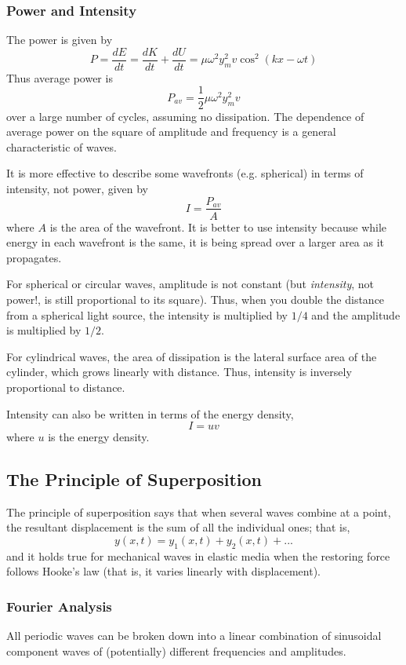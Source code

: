 \documentclass[../PhysicsFormulae.tex]{subfiles}
\begin{document}
\subsubsection{Power and Intensity}
The power is given by 
\[ P = \frac{dE}{dt} = \frac{dK}{dt} + \frac{dU}{dt} = \mu \omega^2 y_m^2 v \cos^2(kx - \omega t) \]
Thus average power is 
\[ P_{av} = \frac{1}{2} \mu \omega^2 y_m^2 v \]
over a large number of cycles, assuming no dissipation. The dependence of average power on the square of amplitude and frequency is a general characteristic of waves.\bigskip

It is more effective to describe some wavefronts (e.g. spherical) in terms of intensity, not power, given by 
\[ I = \frac{P_{av}}{A} \]
where $A$ is the area of the wavefront. It is better to use intensity because while energy in each wavefront is the same, it is being spread over a larger area as it propagates. \bigskip

For spherical or circular waves, amplitude is not constant (but \textit{intensity}, not power!, is still proportional to its square). Thus, when you double the distance from a spherical light source, the intensity is multiplied by $1/4$ and the amplitude is multiplied by $1/2$. \bigskip

For cylindrical waves, the area of dissipation is the lateral surface area of the cylinder, which grows linearly with distance. Thus, intensity is inversely proportional to distance. \bigskip

Intensity can also be written in terms of the energy density, 
\[ I = uv \]
where $u$ is the energy density. 

\subsection{The Principle of Superposition}
The principle of superposition says that when several waves combine at a point, the resultant displacement is the sum of all the individual ones; that is, 
\[ y(x,t) = y_1(x,t) + y_2(x,t) + ...\]
and it holds true for mechanical waves in elastic media when the restoring force follows Hooke's law (that is, it varies linearly with displacement). 

\subsubsection{Fourier Analysis}
All periodic waves can be broken down into a linear combination of sinusoidal component waves of (potentially) different frequencies and amplitudes. \bigskip
\end{document}
